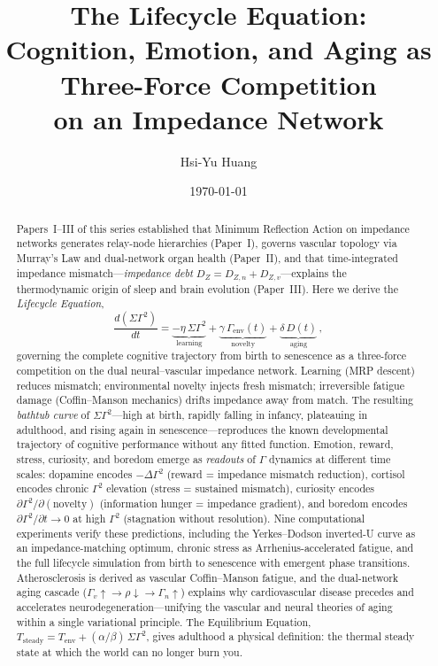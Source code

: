 ﻿\documentclass[aps,pre,twocolumn,superscriptaddress,floatfix]{revtex4-2}
\begin{document}
\title{The Lifecycle Equation:\\
Cognition, Emotion, and Aging as Three-Force Competition\\
on an Impedance Network}

\author{Hsi-Yu Huang}

\date{\today}

\begin{abstract}
Papers~I--III of this series established that Minimum
Reflection Action on impedance networks generates relay-node
hierarchies (Paper~I), governs vascular topology via
Murray's Law and dual-network organ health (Paper~II),
and that time-integrated impedance
mismatch---\emph{impedance debt} $D_Z = D_{Z,n} + D_{Z,v}$---explains
the thermodynamic origin of sleep and brain evolution (Paper~III).
Here we derive the \emph{Lifecycle Equation},
\begin{equation*}
  \frac{d(\Sigma\Gamma^2)}{dt}
    = \underbrace{-\eta\,\Sigma\Gamma^2}_{\text{learning}}
    + \underbrace{\gamma\,\Gamma_{\mathrm{env}}(t)}_{\text{novelty}}
    + \underbrace{\delta\,D(t)}_{\text{aging}}\,,
\end{equation*}
governing the complete cognitive trajectory from birth to
senescence as a three-force competition on the dual
neural--vascular impedance network.
Learning (MRP descent) reduces mismatch; environmental
novelty injects fresh mismatch; irreversible fatigue damage
(Coffin--Manson mechanics) drifts impedance away from match.
The resulting \emph{bathtub curve} of $\Sigma\Gamma^2$---high at
birth, rapidly falling in infancy, plateauing in adulthood,
and rising again in senescence---reproduces the known
developmental trajectory of cognitive performance without
any fitted function.
Emotion, reward, stress, curiosity, and boredom emerge as
\emph{readouts} of $\Gamma$ dynamics at different time scales:
dopamine encodes $-\Delta\Gamma^2$ (reward = impedance
mismatch reduction), cortisol encodes chronic $\Gamma^2$
elevation (stress = sustained mismatch),
curiosity encodes $\partial\Gamma^2/\partial(\text{novelty})$
(information hunger = impedance gradient),
and boredom encodes $\partial\Gamma^2/\partial t \to 0$
at high $\Gamma^2$ (stagnation without resolution).
Nine computational experiments verify these predictions,
including the Yerkes--Dodson inverted-U curve as an
impedance-matching optimum, chronic stress as Arrhenius-accelerated
fatigue, and the full lifecycle simulation from birth to
senescence with emergent phase transitions.
Atherosclerosis is derived as vascular Coffin--Manson fatigue,
and the dual-network aging cascade
($\Gamma_v\!\uparrow \to \rho\!\downarrow \to \Gamma_n\!\uparrow$)
explains why cardiovascular disease precedes and accelerates
neurodegeneration---unifying the vascular and neural theories
of aging within a single variational principle.
The Equilibrium Equation,
$T_{\mathrm{steady}} = T_{\mathrm{env}} + (\alpha/\beta)\,\Sigma\Gamma^2$,
gives adulthood a physical definition:
the thermal steady state at which the world can no longer
burn you.
\end{abstract}
\end{document}

